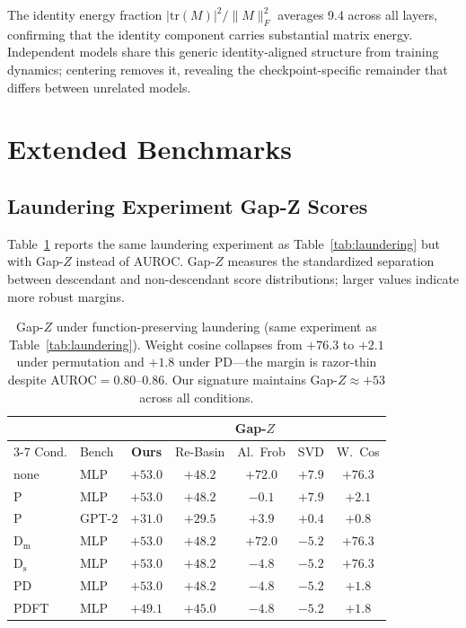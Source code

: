 The identity energy fraction $|\mathrm{tr}(M)|^2 / \|M\|_F^2$ averages 9.4 across all layers, confirming that the identity component carries substantial matrix energy. Independent models share this generic identity-aligned structure from training dynamics; centering removes it, revealing the checkpoint-specific remainder that differs between unrelated models.

\section{Extended Benchmarks}\label{app:benchmarks}

\subsection{Laundering Experiment Gap-Z Scores}\label{app:laundering-gapz}

Table~\ref{tab:laundering-gapz} reports the same laundering experiment as Table~\ref{tab:laundering} but with Gap-$Z$ instead of AUROC. Gap-$Z$ measures the standardized separation between descendant and non-descendant score distributions; larger values indicate more robust margins.

\begin{table}[h]
\centering
\small
\setlength{\tabcolsep}{3pt}
\begin{tabular}{@{}llccccc@{}}
\toprule
& & \multicolumn{5}{c}{Gap-$Z$} \\
\cmidrule(lr){3-7}
Cond. & Bench & \textbf{Ours} & Re-Basin & Al.~Frob & SVD & W.~Cos \\
\midrule
none & MLP & $+53.0$ & $+48.2$ & $+72.0$ & $+7.9$ & $+76.3$ \\
P & MLP & $+53.0$ & $+48.2$ & $-0.1$ & $+7.9$ & $+2.1$ \\
P & GPT-2 & $+31.0$ & $+29.5$ & $+3.9$ & $+0.4$ & $+0.8$ \\
\midrule
D$_\mathrm{m}$ & MLP & $+53.0$ & $+48.2$ & $+72.0$ & $-5.2$ & $+76.3$ \\
D$_\mathrm{s}$ & MLP & $+53.0$ & $+48.2$ & $-4.8$ & $-5.2$ & $+76.3$ \\
PD & MLP & $+53.0$ & $+48.2$ & $-4.8$ & $-5.2$ & $+1.8$ \\
PDFT & MLP & $+49.1$ & $+45.0$ & $-4.8$ & $-5.2$ & $+1.8$ \\
\bottomrule
\end{tabular}
\caption{Gap-$Z$ under function-preserving laundering (same experiment as Table~\ref{tab:laundering}). Weight cosine collapses from $+76.3$ to $+2.1$ under permutation and $+1.8$ under PD---the margin is razor-thin despite AUROC$=$0.80--0.86. Our signature maintains Gap-$Z \approx +53$ across all conditions.}
\label{tab:laundering-gapz}
\end{table}


